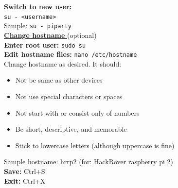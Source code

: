 \documentclass[a4paper, 10pt]{article}
\begin{document}
        \noindent \textbf{Switch to new user:} \\
        \texttt{su - <username>}\\
        Sample: \texttt{su - piparty} \\
        
        \underline{\textbf{Change hostname }}(optional)\\
        \textbf{Enter root user:} \texttt{sudo su} \\
        \textbf{Edit hostname files:} \texttt{nano /etc/hostname} \\
        
        Change hostname as desired. It should:
        \begin{itemize}
            \item Not be same as other devices
            \item Not use special characters or spaces
            \item Not start with or consist only of numbers
            \item Be short, descriptive, and memorable
            \item Stick to lowercase letters (although uppercase is fine)
        \end{itemize}

        
        \noindent Sample hostname: hrrp2 (for:  HackRover raspberry pi 2)\\
         
        \noindent\textbf{Save:} Ctrl+S \\
        \textbf{Exit:} Ctrl+X \\
        
\end{document}
